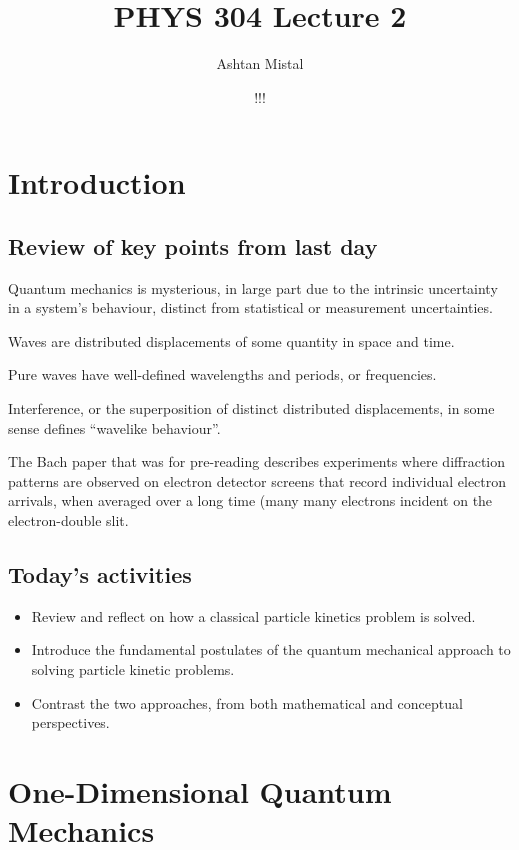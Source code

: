 \documentclass{article}
\title{PHYS 304 Lecture 2}
\author{Ashtan Mistal}
\date{!!!}
\begin{document}
\ifstandalone
\maketitle
\fi

\graphicspath{{./Lecture02/}}

\section{Introduction}


\subsection{Review of key points from last day}

Quantum mechanics is mysterious, in large part due to the intrinsic uncertainty in a system’s behaviour, distinct from statistical or measurement uncertainties.

Waves are distributed displacements of some quantity in space and time.

Pure waves have well-defined wavelengths and periods, or frequencies.

Interference, or the superposition of distinct distributed displacements, in some sense defines “wavelike behaviour”.

The Bach paper that was for pre-reading describes experiments where diffraction patterns are observed on electron detector screens that record individual electron arrivals, when averaged over a long time (many many electrons incident on the electron-double slit.  


\subsection{Today's activities}

\begin{itemize}
    \item Review and reflect on how a classical particle kinetics problem is solved.
    \item Introduce the fundamental postulates of the quantum mechanical approach to solving particle kinetic problems.
    \item Contrast the two approaches, from both mathematical and conceptual perspectives.
\end{itemize}

\section{One-Dimensional Quantum Mechanics}
\end{document}
